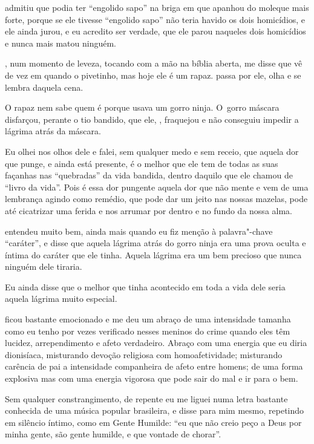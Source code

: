  admitiu que podia ter ``engolido sapo'' na briga em que apanhou do
moleque mais forte, porque se ele tivesse ``engolido sapo'' não teria
havido os dois homicídios, e ele ainda jurou, e eu acredito ser verdade,
que ele parou naqueles dois homicídios e nunca mais matou ninguém.

, num momento de leveza, tocando com a mão na bíblia aberta, me disse
que vê de vez em quando o pivetinho, mas hoje ele é um rapaz.  passa
por ele, olha e se lembra daquela cena.

O rapaz nem sabe quem é  porque  usava um gorro ninja. O~gorro
máscara disfarçou, perante o tio bandido, que ele, , fraquejou e não
conseguiu impedir a lágrima atrás da máscara.

Eu olhei nos olhos dele e falei, sem qualquer medo e sem receio, que
aquela dor que punge, e ainda está presente, é o melhor que ele tem de
todas as suas façanhas nas ``quebradas'' da vida bandida, dentro daquilo
que ele chamou de ``livro da vida''. Pois é essa dor pungente aquela dor
que não mente e vem de uma lembrança agindo como remédio, que pode dar
um jeito nas nossas mazelas, pode até cicatrizar uma ferida e nos
arrumar por dentro e no fundo da nossa alma.

 entendeu muito bem, ainda mais quando eu fiz menção à palavra"-chave
``caráter'', e disse que aquela lágrima atrás do gorro ninja era uma
prova oculta e íntima do caráter que ele tinha. Aquela lágrima era um
bem precioso que nunca ninguém dele tiraria.

Eu ainda disse que o melhor que tinha acontecido em toda a vida dele
seria aquela lágrima muito especial.

 ficou bastante emocionado e me deu um abraço de uma intensidade
tamanha como eu tenho por vezes verificado nesses meninos do crime
quando eles têm lucidez, arrependimento e afeto verdadeiro. Abraço com
uma energia que eu diria dionisíaca, misturando devoção religiosa com
homoafetividade; misturando carência de pai a intensidade companheira de
afeto entre homens; de uma forma explosiva mas com uma energia vigorosa
que pode sair do mal e ir para o bem.

Sem qualquer constrangimento, de repente eu me liguei numa letra
bastante conhecida de uma música popular brasileira, e disse para mim
mesmo, repetindo em silêncio íntimo, como em Gente Humilde: ``eu que não
creio peço a Deus por minha gente, são gente humilde, e que vontade de
chorar''.

